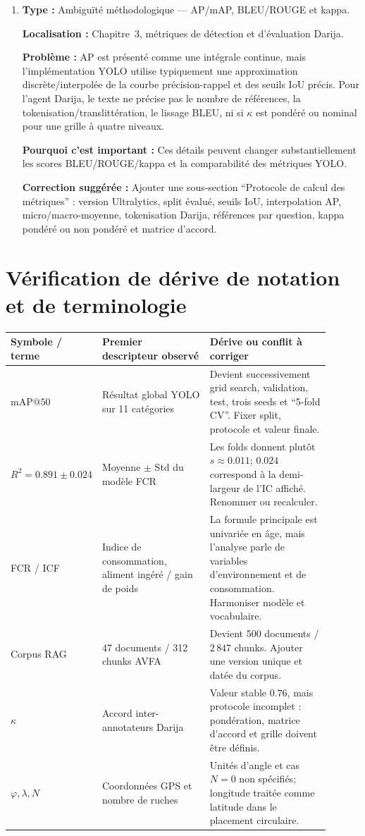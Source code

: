 \documentclass[11pt,a4paper]{article}
\newcommand{\loc}[1]{\textbf{Localisation :} #1\par}
\newcommand{\prob}[1]{\textbf{Problème :} #1\par}
\newcommand{\impact}[1]{\textbf{Pourquoi c'est important :} #1\par}
\newcommand{\fix}[1]{\textbf{Correction suggérée :} #1\par}
\newcommand{\classif}[1]{\textbf{Type :} #1\par}
\begin{document}
\begin{enumerate}
  \item \classif{Ambiguïté méthodologique --- AP/mAP, BLEU/ROUGE et kappa.}
  \loc{Chapitre~3, métriques de détection et d'évaluation Darija.}
  \prob{AP est présenté comme une intégrale continue, mais l'implémentation YOLO utilise typiquement une approximation discrète/interpolée de la courbe précision-rappel et des seuils IoU précis. Pour l'agent Darija, le texte ne précise pas le nombre de références, la tokenisation/translittération, le lissage BLEU, ni si \(\kappa\) est pondéré ou nominal pour une grille à quatre niveaux.}
  \impact{Ces détails peuvent changer substantiellement les scores BLEU/ROUGE/kappa et la comparabilité des métriques YOLO.}
  \fix{Ajouter une sous-section \enquote{Protocole de calcul des métriques} : version Ultralytics, split évalué, seuils IoU, interpolation AP, micro/macro-moyenne, tokenisation Darija, références par question, kappa pondéré ou non pondéré et matrice d'accord.}
\end{enumerate}

\section*{Vérification de dérive de notation et de terminologie}

\begin{center}
\small
\begin{tabular}{p{0.18\linewidth}p{0.34\linewidth}p{0.38\linewidth}}
\toprule
\textbf{Symbole / terme} & \textbf{Premier descripteur observé} & \textbf{Dérive ou conflit à corriger} \\
\midrule
\(\mathrm{mAP@50}\) & Résultat global YOLO sur 11 catégories & Devient successivement grid search, validation, test, trois seeds et \enquote{5-fold CV}. Fixer split, protocole et valeur finale. \\
\(R^2=0.891\pm0.024\) & Moyenne \(\pm\) Std du modèle FCR & Les folds donnent plutôt \(s\approx0.011\); \(0.024\) correspond à la demi-largeur de l'IC affiché. Renommer ou recalculer. \\
FCR / ICF & Indice de consommation, aliment ingéré / gain de poids & La formule principale est univariée en âge, mais l'analyse parle de variables d'environnement et de consommation. Harmoniser modèle et vocabulaire. \\
Corpus RAG & 47 documents / 312 chunks AVFA & Devient 500 documents / \(2\,847\) chunks. Ajouter une version unique et datée du corpus. \\
\(\kappa\) & Accord inter-annotateurs Darija & Valeur stable \(0.76\), mais protocole incomplet : pondération, matrice d'accord et grille doivent être définis. \\
\(\varphi,\lambda,N\) & Coordonnées GPS et nombre de ruches & Unités d'angle et cas \(N=0\) non spécifiés; longitude traitée comme latitude dans le placement circulaire. \\
\bottomrule
\end{tabular}
\end{center}
\end{document}
